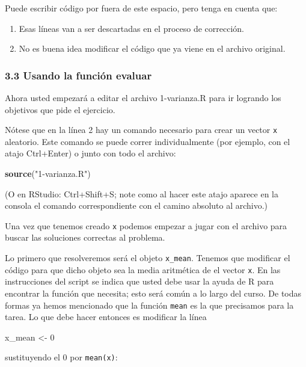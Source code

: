 \documentclass[]{article}
\newenvironment{Shaded}{}{}
\newcommand{\KeywordTok}[1]{\textcolor[rgb]{0.00,0.44,0.13}{\textbf{{#1}}}}
\newcommand{\DecValTok}[1]{\textcolor[rgb]{0.25,0.63,0.44}{{#1}}}
\newcommand{\StringTok}[1]{\textcolor[rgb]{0.25,0.44,0.63}{{#1}}}
\newcommand{\NormalTok}[1]{{#1}}
\begin{document}
Puede escribir código por fuera de este espacio, pero tenga en cuenta
que:

\begin{enumerate}[1.]
\item
  Esas líneas van a ser descartadas en el proceso de corrección.
\item
  No es buena idea modificar el código que ya viene en el archivo
  original.
\end{enumerate}
\subsubsection{3.3 Usando la función evaluar}

Ahora usted empezará a editar el archivo 1-varianza.R para ir logrando
los objetivos que pide el ejercicio.

Nótese que en la línea 2 hay un comando necesario para crear un vector
\texttt{x} aleatorio. Este comando se puede correr individualmente (por
ejemplo, con el atajo Ctrl+Enter) o junto con todo el archivo:

\begin{Shaded}
\begin{Highlighting}[]
\KeywordTok{source}\NormalTok{(}\StringTok{"1-varianza.R"}\NormalTok{)}
\end{Highlighting}
\end{Shaded}
(O en RStudio: Ctrl+Shift+S; note como al hacer este atajo aparece en la
consola el comando correspondiente con el camino absoluto al archivo.)

Una vez que tenemos creado \texttt{x} podemos empezar a jugar con el
archivo para buscar las soluciones correctas al problema.

Lo primero que resolveremos será el objeto \texttt{x\_mean}. Tenemos que
modificar el código para que dicho objeto sea la media aritmética de el
vector \texttt{x}. En las instrucciones del script se indica que usted
debe usar la ayuda de R para encontrar la función que necesita; esto
será común a lo largo del curso. De todas formas ya hemos mencionado que
la función \texttt{mean} es la que precisamos para la tarea. Lo que debe
hacer entonces es modificar la línea

\begin{Shaded}
\begin{Highlighting}[]
\NormalTok{x_mean <- }\DecValTok{0}
\end{Highlighting}
\end{Shaded}
sustituyendo el 0 por \texttt{mean(x)}:
\end{document}

